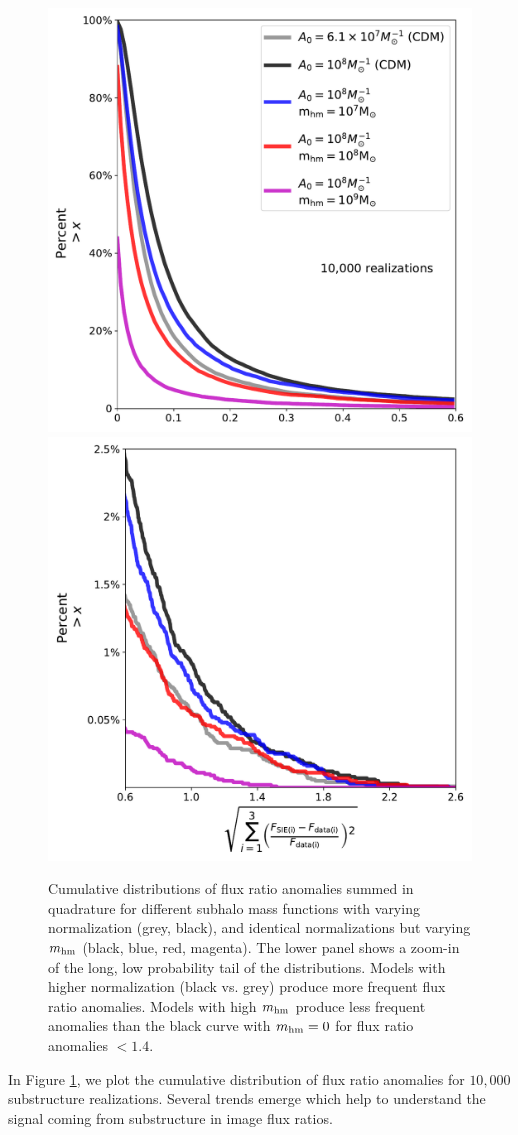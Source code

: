 \begin{figure}
	\includegraphics[clip,trim=0cm 0cm 0.3cm
	0cm,width=.45\textwidth,keepaspectratio]{./figures_ABCforward/nfw_summed_cusp_edited.pdf}
	\includegraphics[clip,trim=0.2cm 0cm .3cm
	0cm,width=.45\textwidth]{./figures_ABCforward/nfw_summed_tail_cusp.pdf}
	\caption{\label{fig:fluxratios} Cumulative distributions of flux ratio anomalies summed in quadrature for different subhalo mass functions with varying normalization (grey, black), and identical normalizations but varying $m_{\rm{hm}}$ (black, blue, red, magenta). The lower panel shows a zoom-in of the long, low probability tail of the distributions. Models with higher normalization (black vs. grey) produce more frequent flux ratio anomalies. Models with high $m_{\rm{hm}}$ produce less frequent anomalies than the black curve with $m_{\rm{hm}} = 0$ for flux ratio anomalies $<1.4$.}
\end{figure}

In Figure \ref{fig:fluxratios}, we plot the cumulative distribution of flux ratio anomalies for $10,000$ substructure realizations. Several trends emerge which help to understand the signal coming from substructure in image flux ratios.

